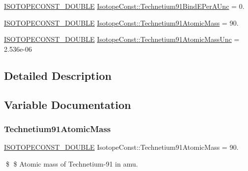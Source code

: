 \begin{DoxyCompactItemize}
\mbox{\hyperlink{group___isotope_const-_macros_ga8f45a7272ce02c0b4c65c44636ed719a}{I\+S\+O\+T\+O\+P\+E\+C\+O\+N\+S\+T\+\_\+\+D\+O\+U\+B\+LE}} \mbox{\hyperlink{group___isotope_const-_technetium-_tc91_ga9e816d0504d8a74e7370484b130ddf3e}{Isotope\+Const\+::\+Technetium91\+Bind\+E\+Per\+A\+Unc}} = 0.
\item 
\mbox{\hyperlink{group___isotope_const-_macros_ga8f45a7272ce02c0b4c65c44636ed719a}{I\+S\+O\+T\+O\+P\+E\+C\+O\+N\+S\+T\+\_\+\+D\+O\+U\+B\+LE}} \mbox{\hyperlink{group___isotope_const-_technetium-_tc91_ga06cb0c5b2ddbe92fc55316860610cc66}{Isotope\+Const\+::\+Technetium91\+Atomic\+Mass}} = 90.
\item 
\mbox{\hyperlink{group___isotope_const-_macros_ga8f45a7272ce02c0b4c65c44636ed719a}{I\+S\+O\+T\+O\+P\+E\+C\+O\+N\+S\+T\+\_\+\+D\+O\+U\+B\+LE}} \mbox{\hyperlink{group___isotope_const-_technetium-_tc91_ga4c5e4c24159d4df539c5bdd149e28a9e}{Isotope\+Const\+::\+Technetium91\+Atomic\+Mass\+Unc}} = 2.\+536e-\/06
\end{DoxyCompactItemize}


\subsection{Detailed Description}


\subsection{Variable Documentation}
\mbox{\label{group___isotope_const-_technetium-_tc91_ga06cb0c5b2ddbe92fc55316860610cc66}} 
\subsubsection{\texorpdfstring{Technetium91\+Atomic\+Mass}{Technetium91AtomicMass}}
{\footnotesize\ttfamily \mbox{\hyperlink{group___isotope_const-_macros_ga8f45a7272ce02c0b4c65c44636ed719a}{I\+S\+O\+T\+O\+P\+E\+C\+O\+N\+S\+T\+\_\+\+D\+O\+U\+B\+LE}} Isotope\+Const\+::\+Technetium91\+Atomic\+Mass = 90.}

\$ \$ Atomic mass of Technetium-\/91 in amu. \mbox{\label{group___isotope_const-_technetium-_tc91_ga4c5e4c24159d4df539c5bdd149e28a9e}} 

